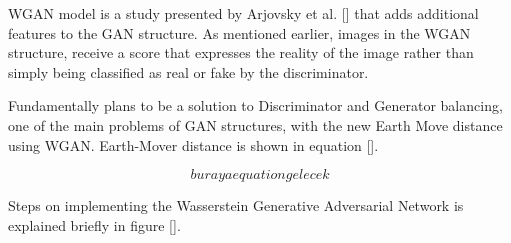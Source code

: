 WGAN model is a study presented by Arjovsky et al. [] that adds additional features to the GAN structure. As mentioned earlier, images in the WGAN structure, receive a score that expresses the reality of the image rather than simply being classified as real or fake by the discriminator.

Fundamentally plans to be a solution to Discriminator and Generator balancing, one of the main problems of GAN structures, with the new Earth Move distance using WGAN. Earth-Mover distance is shown in equation [].

\begin{equation}
    buraya equation gelecek
\end{equation}

Steps on implementing the Wasserstein Generative Adversarial Network is explained briefly in figure [].